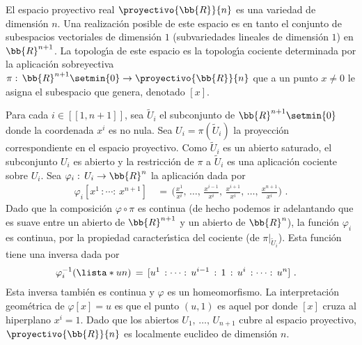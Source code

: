 \begin{ejemplo}
	El espacio proyectivo real $\proyectivo{\bb{R}}{n}$ es una variedad
	de dimensi\'{o}n $n$. Una realizaci\'{o}n posible de este espacio es
	en tanto el conjunto de subespacios vectoriales de dimensi\'{o}n $1$
	(subvariedades lineales de dimensi\'{o}n $1$) en $\bb{R}^{n+1}$. La
	topolog\'{\i}a de este espacio es la topolog\'{\i}a cociente
	determinada por la aplicaci\'{o}n sobreyectiva
	$\pi:\,\bb{R}^{n+1}\setmin\{0\}\rightarrow\proyectivo{\bb{R}}{n}$
	que a un punto $x\not =0$ le asigna el subespacio que genera,
	denotado $[x]$.

	Para cada $i\in[\![1,n+1]\!]$, sea $\widetilde{U}_{i}$ el
	subconjunto de $\bb{R}^{n+1}\setmin\{0\}$ donde la coordenada
	$x^{i}$ es no nula. Sea $U_{i}=\pi(\widetilde{U}_{i})$ la
	proyecci\'{o}n correspondiente en el espacio proyectivo. Como
	$\widetilde{U}_{i}$ es un abierto saturado, el subconjunto $U_{i}$
	es abierto y la restricci\'{o}n de $\pi$ a $\widetilde{U}_{i}$ es
	una aplicaci\'{o}n cociente sobre $U_{i}$. Sea
	$\varphi_{i}:\,U_{i}\rightarrow\bb{R}^{n}$ la aplicaci\'{o}n dada por
	\begin{align*}
		\varphi_{i}[x^{1}\,:\cdots:\,x^{n+1}] & \,=\,
			\Big(\frac{x^{1}}{x^{i}},\,\dots,\,
			\frac{x^{i-1}}{x^{i}},\,\frac{x^{i+1}}{x^{i}},
			\,\dots,\,\frac{x^{n+1}}{x^{i}}
			\Big)
		\text{ .}
	\end{align*}
	Dado que la composici\'{o}n $\varphi\circ\pi$ es continua (de
	hecho podemos ir adelantando que es suave entre un abierto de
	$\bb{R}^{n+1}$ y un abierto de $\bb{R}^{n}$), la funci\'{o}n
	$\varphi_{i}$ es continua, por la propiedad caracter\'{\i}stica
	del cociente (de $\pi|_{\widetilde{U}_{i}}$). Esta funci\'{o}n
	tiene una inversa dada por
	\begin{align*}
		\varphi_{i}^{-1}(\lista*{u}{n}) & \,=\,
			[u^{1}\,:\dots:\,u^{i-1}\,:\,1\,:\,
			u^{i}\,:\dots:\,u^{n}]
		\text{ .}
	\end{align*}
	Esta inversa tambi\'{e}n es continua y $\varphi$ es un
	homeomorfismo. La interpretaci\'{o}n geom\'{e}trica de $\varphi[x]=u$
	es que el punto $(u,1)$ es aquel por donde $[x]$ cruza al hiperplano
	$x^{i}=1$. Dado que los abiertos $U_{1},\,\dots,\,U_{n+1}$ cubre al
	espacio proyectivo, $\proyectivo{\bb{R}}{n}$ es localmente euclideo
	de dimensi\'{o}n $n$.


\end{ejemplo}
